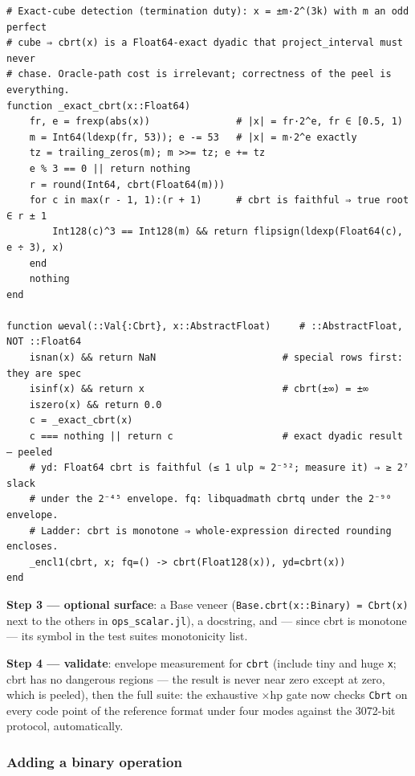 \begin{verbatim}
# Exact-cube detection (termination duty): x = ±m·2^(3k) with m an odd perfect
# cube ⇒ cbrt(x) is a Float64-exact dyadic that project_interval must never
# chase. Oracle-path cost is irrelevant; correctness of the peel is everything.
function _exact_cbrt(x::Float64)
    fr, e = frexp(abs(x))               # |x| = fr·2^e, fr ∈ [0.5, 1)
    m = Int64(ldexp(fr, 53)); e -= 53   # |x| = m·2^e exactly
    tz = trailing_zeros(m); m >>= tz; e += tz
    e % 3 == 0 || return nothing
    r = round(Int64, cbrt(Float64(m)))
    for c in max(r - 1, 1):(r + 1)      # cbrt is faithful ⇒ true root ∈ r ± 1
        Int128(c)^3 == Int128(m) && return flipsign(ldexp(Float64(c), e ÷ 3), x)
    end
    nothing
end

function ωeval(::Val{:Cbrt}, x::AbstractFloat)     # ::AbstractFloat, NOT ::Float64
    isnan(x) && return NaN                      # special rows first: they are spec
    isinf(x) && return x                        # cbrt(±∞) = ±∞
    iszero(x) && return 0.0
    c = _exact_cbrt(x)
    c === nothing || return c                   # exact dyadic result — peeled
    # yd: Float64 cbrt is faithful (≤ 1 ulp ≈ 2⁻⁵²; measure it) ⇒ ≥ 2⁷ slack
    # under the 2⁻⁴⁵ envelope. fq: libquadmath cbrtq under the 2⁻⁹⁰ envelope.
    # Ladder: cbrt is monotone ⇒ whole-expression directed rounding encloses.
    _encl1(cbrt, x; fq=() -> cbrt(Float128(x)), yd=cbrt(x))
end
\end{verbatim}



\textbf{Step 3 — optional surface}: a Base veneer (\texttt{Base.cbrt(\allowbreak{}x::Binary) = Cbrt(\allowbreak{}x)} next to the others in \texttt{ops\_\allowbreak{}scalar.jl}), a docstring, and — since cbrt is monotone — its symbol in the test suite{\textquotesingle}s monotonicity list.



\textbf{Step 4 — validate}: envelope measurement for \texttt{cbrt} (include tiny and huge \texttt{x}; cbrt has no dangerous regions — the result is never near zero except at zero, which is peeled), then the full suite: the exhaustive ×hp gate now checks \texttt{Cbrt} on every code point of the reference format under four modes against the 3072-bit protocol, automatically.



\subsubsection{Adding a binary operation}



